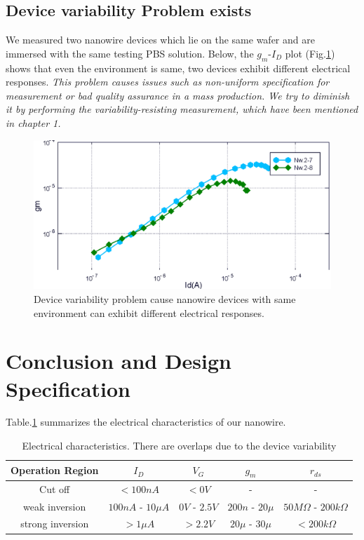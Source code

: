 \subsection{Device variability Problem exists}
We measured two nanowire devices which lie on the same wafer and are immersed with the same testing PBS solution.
Below, the $g_m$-$I_D$ plot (Fig.\ref{fig:disparity}) shows that even the environment is same, two devices exhibit different electrical responses.
\emph{This problem causes issues such as non-uniform specification for measurement or bad quality assurance in a mass production.
We try to diminish it by performing the variability-resisting measurement, which have been mentioned in chapter 1.}

\begin{figure}[!htbp]
    \centering
    \def\svgwidth{width=0.67\textwidth}
    \includegraphics[width=1\textwidth] {images/chapter3/pDisparity.eps}
    \caption{Device variability problem cause nanowire devices with same environment can exhibit different electrical responses.}
    \label{fig:disparity}
\end{figure}


\FloatBarrier

\section{Conclusion and Design Specification} \label{sec:spec3}

Table.\ref{tb:NWcharacter} summarizes the electrical characteristics of our nanowire.
\begin{table}[h!bp]
    {\fontfamily{}\fontsize{10}{14}\selectfont
    \centering
    \begin{tabular}{c|c|c|c|c}
        Operation Region & $I_D$ & $V_G$ & $g_m$ & $r_{ds}$ \\
        \hline
        Cut off & $< 100n A$ & $< 0 V$ & - & - \\
        weak inversion & $100n A$ - $10\mu A$ & $0 V$ - $2.5V$ & $200n $ - $20\mu$ & $50M\Omega$ - $200k\Omega$ \\
        strong inversion & $> 1\mu A$ & $> 2.2V$ & $20\mu$ - $30\mu$ & $< 200k\Omega $ \\
    \end{tabular}
    \caption{Electrical characteristics. There are overlaps due to the device variability}
    \label{tb:NWcharacter}
    }
\end{table}

